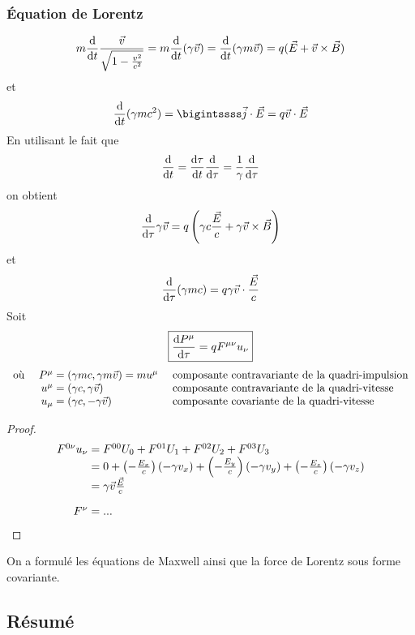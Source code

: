 \subsubsection*{Équation de Lorentz}

$$
	m\frac{\mathrm{d}}{\mathrm{d} t}\frac{\vec{v}}{\sqrt{1-\frac{v^2}{c^2}}}=m\frac{\mathrm{d} }{\mathrm{d} t}(\gamma\vec{v})=\frac{\mathrm{d} }{\mathrm{d} t}(\gamma m \vec{v})=q(\vec{E}+\vec{v}\times\vec{B})
$$
et
$$
	\frac{\dif}{\dif t}(\gamma m c^2)=\bigintssss\vec{j}\cdot\vec{E}=q\vec{v}\cdot\vec{E}
$$
En utilisant le fait que
$$
	\frac{\mathrm{d}}{\mathrm{d} t}=\frac{\mathrm{d}\tau}{\mathrm{d} t}\frac{\mathrm{d}}{\mathrm{d}\tau}=\frac{1}{\gamma}\frac{\mathrm{d}}{\mathrm{d}\tau}\\
$$
on obtient
$$
	\frac{\mathrm{d}}{\mathrm{d}\tau}\gamma\vec{v}=q\left(\gamma c\frac{\vec{E}}{c}+\gamma\vec{v}\times\vec{B}\right)
$$
et
$$
	\frac{\mathrm{d}}{\mathrm{d}\tau}(\gamma mc)=q\gamma\vec{v}\cdot\frac{\vec{E}}{c}
$$
Soit
$$
	\boxed{\frac{\mathrm{d} P^\mu}{\mathrm{d}\tau}=qF^{\mu\nu}u_\nu}
$$
{\renewcommand*{\arraystretch}{1.2}
$$
	\begin{array}{lr@{\;}ll}
		\text{o\`u }&P^\mu&=(\gamma mc,\gamma m\vec{v})=mu^\mu&\text{ composante contravariante de la quadri-impulsion}\\
		&u^\mu&=(\gamma c,\gamma\vec{v})&\text{ composante contravariante de la quadri-vitesse}\\
		&u_\mu&=(\gamma c,-\gamma\vec{v})&\text{ composante covariante de la quadri-vitesse}
	\end{array}
$$}

\begin{proof}
$$
	\begin{array}{r@{\;}l}
		F^{0\nu}u_\nu&=F^{00}U_0+F^{01}U_1+F^{02}U_2+F^{03}U_3\\
			&=0+\left(-\frac{E_x}{c}\right)(-\gamma v_x)+\left(-\frac{E_y}{c}\right)(-\gamma v_y)+\left(-\frac{E_z}{c}\right)(-\gamma v_z)\\
			&=\gamma\vec{v}\frac{\vec{E}}{c}\\[10pt]
		F^{\nu}&=...
	\end{array}
$$
\end{proof}

\begin{conc}
On a formulé les équations de Maxwell ainsi que la force de Lorentz sous forme covariante.
\end{conc}

\subsection{Résumé}

